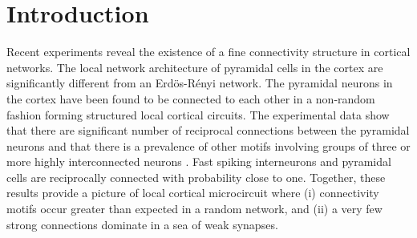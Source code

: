 
\section{Introduction}

Recent experiments reveal the existence of a fine connectivity structure in cortical networks. The local network architecture of pyramidal cells in the cortex are significantly different from an Erdös-Rényi network. The pyramidal neurons in the cortex have been found to be connected to each other in a non-random fashion forming structured local cortical circuits. The experimental data show that there are significant number of reciprocal connections between the pyramidal neurons and that there is a prevalence of other motifs involving groups of three or more highly interconnected neurons \cite{markram1997,thomson2002, Song2005, Perin2011}. Fast spiking interneurons and pyramidal cells are reciprocally connected with probability close to one\cite{Yoshimura2005}. Together, these results provide a picture of local cortical microcircuit where (i) connectivity motifs occur greater than expected in a random network, and (ii) a very few strong connections dominate in a sea of weak synapses.

